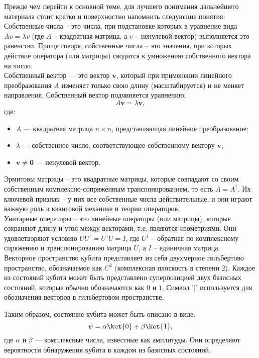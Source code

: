 Прежде чем перейти к основной теме, для лучшего понимания дальнейшего материала стоит кратко и поверхностно напомнить следующие понятия: \\ 

Собственные числа – это числа, при подстановке которых в уравнение вида \(A v = \lambda v\) (где \(A\) – квадратная матрица, а \(v\) – ненулевой вектор) выполняется это равенство. Проще говоря, собственные числа – это значения, при которых действие оператора (или матрицы) сводится к умножению собственного вектора на число. \\

Собственный вектор — это вектор \( \mathbf{v} \), который при применении линейного преобразования \( A \) изменяет только свою длину (масштабируется) и не меняет направления. Собственный вектор подчиняется уравнению:
\[
A\mathbf{v} = \lambda \mathbf{v},
\]
где:
\begin{itemize}
    \item \( A \) — квадратная матрица \( n \times n \), представляющая линейное преобразование;
    \item \( \lambda \) — собственное число, соответствующее собственному вектору \( \mathbf{v} \);
    \item \( \mathbf{v} \neq \mathbf{0} \) — ненулевой вектор.
\end{itemize}

Эрмитовы матрицы – это квадратные матрицы, которые совпадают со своим собственным комплексно-сопряжённым транспонированием, то есть \(A = A^\dagger\). Их ключевой признак – у них все собственные числа действительные, и они играют важную роль в квантовой механике и теории операторов. \\

Унитарные операторы – это линейные операторы (или матрицы), которые сохраняют длину и угол между векторами, т.е. являются изометриями. Они удовлетворяют условию \(U U^\dagger = U^\dagger U = I\), где \(U^\dagger\) – обратная по комплексному спряжению и транспонированию матрица \(U\), а \(I\) – единичная матрица. \\ 

Векторное пространство кубита представляет из себя двухмерное гильбертово пространство, обозначаемое как $C^2$ (комплексная плоскость в степени 2). Каждое из состояний кубита может быть представлено суперпозицией двух базисных состояний, которые обычно обозначаются как ${0}$ и ${1}$. Символ '|' используется для обозначения векторов в гильбертовом пространстве.

Таким образом, состояние кубита может быть описано в виде:
\[
{\psi} = \alpha \ket{0} + \beta \ket{1},
\]
где $\alpha$ и $\beta$ — комплексные числа, известные как амплитуды. Они определяют вероятности обнаружения кубита в каждом из базисных состояний.

